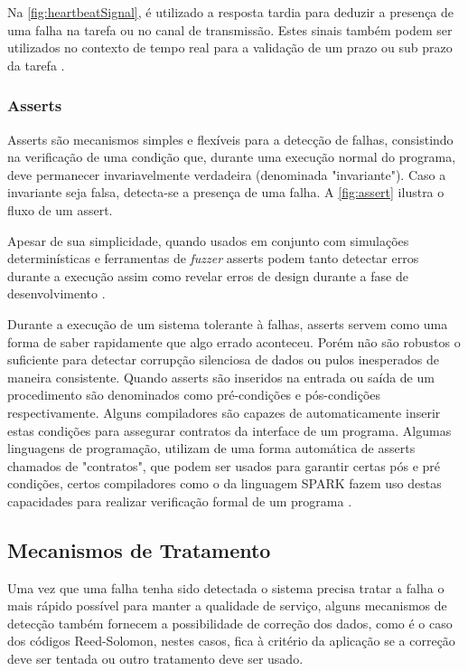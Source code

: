 Na \autoref{fig:heartbeatSignal}, é utilizado a resposta tardia para deduzir a presença de uma falha na tarefa ou no canal de transmissão. Estes sinais também podem ser utilizados no contexto de tempo real para a validação de um prazo ou sub prazo da tarefa \cite{FaultTolerantSystems}.

\subsubsection{Asserts}

Asserts são mecanismos simples e flexíveis para a detecção de falhas, consistindo na verificação de uma condição que, durante uma execução normal do programa, deve permanecer invariavelmente verdadeira (denominada "invariante"). Caso a invariante seja falsa, detecta-se a presença de uma falha. A \autoref{fig:assert} ilustra o fluxo de um assert.


Apesar de sua simplicidade, quando usados em conjunto com simulações determinísticas e ferramentas de \textit{fuzzer} asserts podem tanto detectar erros durante a execução assim como revelar erros de design durante a fase de desenvolvimento \cite{TigerBeetleSafety} \cite{PowerOf10Rules}.

Durante a execução de um sistema tolerante à falhas, asserts servem como uma forma de saber rapidamente que algo errado aconteceu. Porém não são robustos o suficiente para detectar corrupção silenciosa de dados ou pulos inesperados de maneira consistente. Quando asserts são inseridos na entrada ou saída de um procedimento são denominados como pré-condições e pós-condições respectivamente. Alguns compiladores são capazes de automaticamente inserir estas condições para assegurar contratos da interface de um programa. Algumas linguagens de programação, utilizam de uma forma automática de asserts chamados de "contratos", que podem ser usados para garantir certas pós e pré condições, certos compiladores como o da linguagem SPARK fazem uso destas capacidades para realizar verificação formal de um programa \cite{SPARKContracts}.

\subsection{Mecanismos de Tratamento}

Uma vez que uma falha tenha sido detectada o sistema precisa tratar a falha o mais rápido possível para manter a qualidade de serviço, alguns mecanismos de detecção também fornecem a possibilidade de correção dos dados, como é o caso dos códigos Reed-Solomon, nestes casos, fica à critério da aplicação se a correção deve ser tentada ou outro tratamento deve ser usado.

